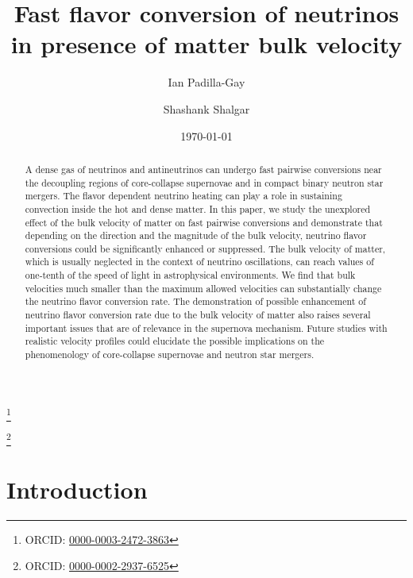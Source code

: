 \documentclass[aps, prd, 10pt, twocolumn, superscriptaddress, noshowpacs, preprintnumbers, longbibliography, groupedaddress, footinbib, bibnotes]{revtex4-1}
\begin{document}
\title{Fast flavor conversion of neutrinos in presence of matter bulk velocity}


\author{Ian Padilla-Gay}
\thanks{ORCID: \href{https://orcid.org/0000-0003-2472-3863}{0000-0003-2472-3863}}

\author{Shashank Shalgar}
\thanks{ORCID: \href{https://orcid.org/0000-0002-2937-6525}{0000-0002-2937-6525}}



\date{\today}

\begin{abstract}
A dense gas of neutrinos and antineutrinos can undergo fast pairwise conversions near the decoupling regions of core-collapse supernovae and in compact binary neutron star mergers. The flavor dependent neutrino heating can play a role in sustaining convection inside the hot and dense matter. In this paper, we study the unexplored effect of the bulk velocity of matter on fast pairwise conversions and demonstrate that depending on the direction and the magnitude of the bulk velocity, neutrino flavor conversions could be significantly enhanced or suppressed. The bulk velocity of matter, which is usually neglected in the context of neutrino oscillations, can reach values of one-tenth of the speed of light in astrophysical environments. We find that bulk velocities much smaller than the maximum allowed velocities can substantially change the neutrino flavor conversion rate. The demonstration of possible enhancement of neutrino flavor conversion rate due to the bulk velocity of matter also raises several important issues that are of relevance in the supernova mechanism. Future studies with realistic velocity profiles could elucidate the possible implications on the phenomenology of core-collapse supernovae and neutron star mergers.
\end{abstract}

\maketitle

\section{Introduction}\label{sec:intro}
\end{document}
